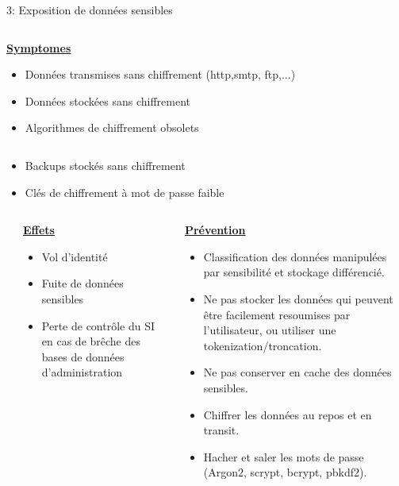 \documentclass[final,hyperref={pdfpagelabels=false}]{beamer}
\begin{document}
\begin{frame}[t]
\begin{columns}[t]
\begin{column}{.465\textwidth}
\begin{block}{3: Exposition de données sensibles}
\begin{columns}[T]
		\begin{column}{.875\textwidth}
			\uline{\uline{\textbf{Symptomes}}}
			\begin{itemize}
				\item Données transmises sans chiffrement (http,smtp, ftp,...)
				\item Données stockées sans chiffrement
				\item Algorithmes de chiffrement obsolets 
			\end{itemize}
		\end{column}
	\end{columns}
	\begin{itemize}
		\item Backups stockés sans chiffrement 
		\item Clés de chiffrement à mot de passe faible
	\end{itemize}
	\begin{columns}[T]
		\begin{column}{.01\textwidth}
		\end{column}
		\begin{column}{0.495\textwidth}
			\vfill
			\uline{\textbf{Effets}}
			\begin{itemize}
				\item Vol d'identité
				\item Fuite de données sensibles
				\item Perte de contrôle du SI en cas de brêche des bases de données d'administration
			\end{itemize}
			\vfill
		\end{column}
		\begin{column}{0.495\textwidth}
			\vfill
			\uline{\textbf{Prévention}}
			\begin{itemize}
				\item Classification des données manipulées par sensibilité et stockage différencié.
				\item Ne pas stocker les données qui peuvent être facilement resoumises par l'utilisateur, ou utiliser une tokenization/troncation.
				\item Ne pas conserver en cache des données sensibles.
				\item Chiffrer les données au repos et en transit.
				\item Hacher et saler les mots de passe (Argon2, scrypt, bcrypt, pbkdf2).
			\end{itemize}
		\end{column}
	\end{columns}




\end{block}
\end{column}
\end{columns}
\end{frame}
\end{document}

